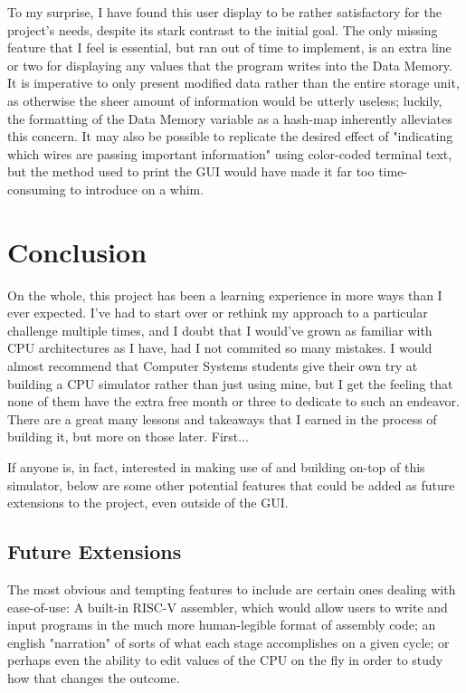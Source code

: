 \documentclass[12pt,twoside]{reedthesis}
\begin{document}
To my surprise, I have found this user display to be rather satisfactory for the project's needs, despite its stark contrast to the initial goal. The only missing feature that I feel is essential, but ran out of time to implement, is an extra line or two for displaying any values that the program writes into the Data Memory. It is imperative to only present modified data rather than the entire storage unit, as otherwise the sheer amount of information would be utterly useless; luckily, the formatting of the Data Memory variable as a hash-map inherently alleviates this concern. It may also be possible to replicate the desired effect of "indicating which wires are passing important information" using color-coded terminal text, but the method used to print the GUI would have made it far too time-consuming to introduce on a whim.


\chapter*{Conclusion}
\setcounter{chapter}{4}
\setcounter{section}{0}

On the whole, this project has been a learning experience in more ways than I ever expected. I've had to start over or rethink my approach to a particular challenge multiple times, and I doubt that I would've grown as familiar with CPU architectures as I have, had I not commited so many mistakes. I would almost recommend that Computer Systems students give their own try at building a CPU simulator rather than just using mine, but I get the feeling that none of them have the extra free month or three to dedicate to such an endeavor.
There are a great many lessons and takeaways that I earned in the process of building it, but more on those later. First...

If anyone is, in fact, interested in making use of and building on-top of this simulator, below are some other potential features that could be added as future extensions to the project, even outside of the GUI.

\section{Future Extensions}

The most obvious and tempting features to include are certain ones dealing with ease-of-use: A built-in RISC-V assembler, which would allow users to write and input programs in the much more human-legible format of assembly code; an english "narration" of sorts of what each stage accomplishes on a given cycle; or perhaps even the ability to edit values of the CPU on the fly in order to study how that changes the outcome.
\end{document}
